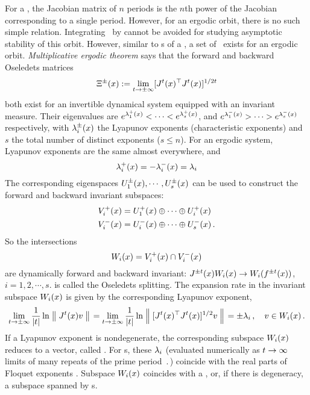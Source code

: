 For a \po, the Jacobian matrix of $n$ periods is the $n$th power of the Jacobian
corresponding to a single period. However, for an ergodic orbit, there is no
such simple relation. Integrating \JacobianM\ by
 cannot be avoided for studying asymptotic stability of this
orbit. However, similar to \Fv s of a \po, a set of \cLvs\
exists for an ergodic orbit.
\emph{Multiplicative ergodic theorem} says that the forward and backward
Oseledets matrices
\begin{equation}
  \Xi^{\pm}(x) :=\lim_{t\to\pm\infty}[J^t(x)^\top J^{t}(x)]^{1/2t}
  \label{eq:oseledets}
\end{equation}
both exist for an invertible dynamical system equipped with an invariant measure.
Their eigenvalues are
$e^{\lambda^{+}_1(x)}<\cdots<e^{\lambda^{+}_s(x)}$,
and $e^{\lambda^{-}_1(x)}>\cdots>e^{\lambda^{-}_s(x)}$ respectively,
with $\lambda^{\pm}_i(x)$ the
Lyapunov exponents (characteristic exponents) and $s$
the total number of distinct exponents ($s\le n$). For an ergodic system,
Lyapunov exponents are the same almost everywhere, and
\begin{equation}
  \label{eq:lyap}
  \lambda^{+}_i(x)=-\lambda^{-}_{i}(x)=\lambda_i
\end{equation}
The corresponding eigenspaces
$U^\pm_1(x), \cdots, U^\pm_s(x)$
can be used to construct the forward and backward invariant subspaces:
\begin{align*}
  V^+_i(x) & = U^+_1(x) \oplus \cdots \oplus U^+_i(x) \\
  V^-_i(x) & = U^-_i(x) \oplus \cdots \oplus U^-_{s}(x)
  \,.
\end{align*}
So the intersections
\begin{equation}
  \label{eq:inter}
  W_i(x)=V^+_i(x)\cap V^-_i(x)
\end{equation}
are dynamically
forward and backward invariant: $J^{\pm t}(x)W_i(x) \to W_i({f^{\pm t}(x)})$,
$i = 1, 2,\cdots,s$. \refeq{eq:inter} is called the Oseledets splitting.
The expansion rate in the invariant subspace $W_i(x)$ is given
by the corresponding Lyapunov exponent,
\begin{equation}
  \label{eq:lyapunov}
  \lim_{t\to\pm\infty}\frac{1}{|t|}\ln\left\Arrowvert \, J^t(x)v \, \right\Arrowvert
  =\lim_{t\to\pm\infty}\frac{1}{|t|}\ln\left\Arrowvert \, [J^t(x)^\top J^t(x)]^{1/2}v \, \right\Arrowvert
  = \pm\lambda_i
  \,,\quad v\in W_i(x)
  \,.
\end{equation}
If a Lyapunov exponent is nondegenerate, the corresponding
subspace $W_i(x)$ reduces to a vector, called \emph{\cLv}.
For \po s, these $\lambda_i$
(evaluated numerically as $t\to\infty$ limits of many repeats of the
prime period $\period{}$) coincide with the real parts of Floquet exponents
\refeq{eq:fe}. Subspace $W_i(x)$ coincides with
a \Fv, or, if there is degeneracy, a subspace
spanned by \Fv s.

